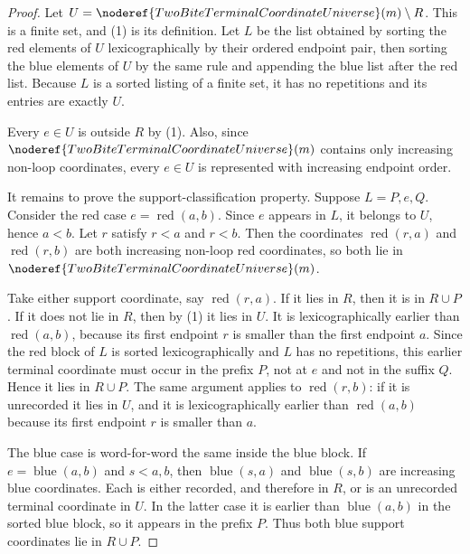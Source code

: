 \begin{proof}
Let \(U=\noderef{TwoBiteTerminalCoordinateUniverse}(m)\setminus R\).  This is
a finite set, and (1) is its definition.  Let \(L\) be the list obtained by
sorting the red elements of \(U\) lexicographically by their ordered endpoint
pair, then sorting the blue elements of \(U\) by the same rule and appending
the blue list after the red list.  Because \(L\) is a sorted listing of a
finite set, it has no repetitions and its entries are exactly \(U\).

Every \(e\in U\) is outside \(R\) by (1).  Also, since
\(\noderef{TwoBiteTerminalCoordinateUniverse}(m)\) contains only increasing
non-loop coordinates, every \(e\in U\) is represented with increasing
endpoint order.

It remains to prove the support-classification property.  Suppose
\(L=P,e,Q\).  Consider the red case \(e=\operatorname{red}(a,b)\).  Since
\(e\) appears in \(L\), it belongs to \(U\), hence \(a<b\).  Let \(r\) satisfy
\(r<a\) and \(r<b\).  Then the coordinates \(\operatorname{red}(r,a)\) and
\(\operatorname{red}(r,b)\) are both increasing non-loop red coordinates, so
both lie in \(\noderef{TwoBiteTerminalCoordinateUniverse}(m)\).

Take either support coordinate, say \(\operatorname{red}(r,a)\).  If it lies
in \(R\), then it is in \(R\cup P\).  If it does not lie in \(R\), then by
(1) it lies in \(U\).  It is lexicographically earlier than
\(\operatorname{red}(a,b)\), because its first endpoint \(r\) is smaller than
the first endpoint \(a\).  Since the red block of \(L\) is sorted
lexicographically and \(L\) has no repetitions, this earlier terminal
coordinate must occur in the prefix \(P\), not at \(e\) and not in the suffix
\(Q\).  Hence it lies in \(R\cup P\).  The same argument applies to
\(\operatorname{red}(r,b)\): if it is unrecorded it lies in \(U\), and it is
lexicographically earlier than \(\operatorname{red}(a,b)\) because its first
endpoint \(r\) is smaller than \(a\).

The blue case is word-for-word the same inside the blue block.  If
\(e=\operatorname{blue}(a,b)\) and \(s<a,b\), then
\(\operatorname{blue}(s,a)\) and \(\operatorname{blue}(s,b)\) are increasing
blue coordinates.  Each is either recorded, and therefore in \(R\), or is an
unrecorded terminal coordinate in \(U\).  In the latter case it is earlier
than \(\operatorname{blue}(a,b)\) in the sorted blue block, so it appears in
the prefix \(P\).  Thus both blue support coordinates lie in \(R\cup P\).
\end{proof}
